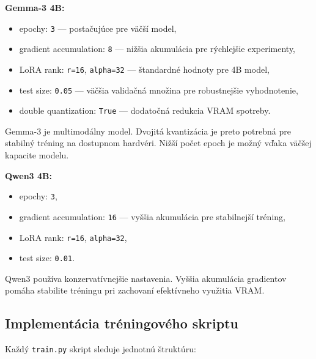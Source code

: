 \textbf{Gemma-3 4B:}
\begin{itemize}
    \item epochy: \texttt{3} — postačujúce pre väčší model,
    \item gradient accumulation: \texttt{8} — nižšia akumulácia pre rýchlejšie experimenty,
    \item LoRA rank: \texttt{r=16}, \texttt{alpha=32} — štandardné hodnoty pre 4B model,
    \item test size: \texttt{0.05} — väčšia validačná množina pre robustnejšie vyhodnotenie,
    \item double quantization: \texttt{True} — dodatočná redukcia VRAM spotreby.
\end{itemize}
 
Gemma-3 je multimodálny model. Dvojitá kvantizácia je preto potrebná pre stabilný tréning na dostupnom hardvéri. Nižší počet epoch je možný vďaka väčšej kapacite modelu.
 
\textbf{Qwen3 4B:}
\begin{itemize}
    \item epochy: \texttt{3},
    \item gradient accumulation: \texttt{16} — vyššia akumulácia pre stabilnejší tréning,
    \item LoRA rank: \texttt{r=16}, \texttt{alpha=32},
    \item test size: \texttt{0.01}.
\end{itemize}
 
Qwen3 používa konzervatívnejšie nastavenia. Vyššia akumulácia gradientov pomáha stabilite tréningu pri zachovaní efektívneho využitia VRAM.
 
\subsection{Implementácia tréningového skriptu}
 
Každý \texttt{train.py} skript sleduje jednotnú štruktúru:
 
